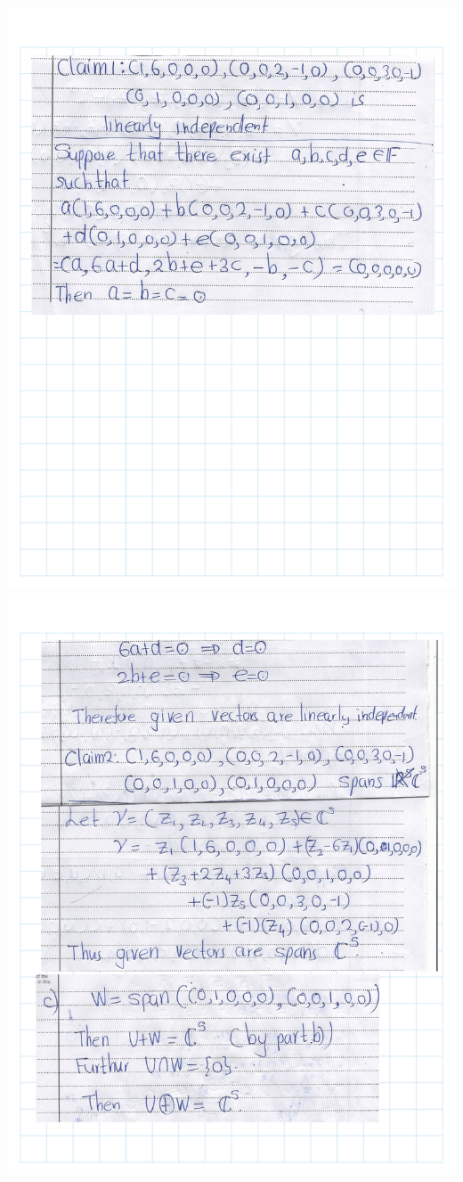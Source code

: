 \documentclass[
]{book}
\theoremstyle{definition}
\theoremstyle{definition}
\theoremstyle{definition}
\theoremstyle{definition}
\theoremstyle{remark}
\begin{document}
\includegraphics{fig/Ex 2B and 2C/EX2B (11).png}
\includegraphics{fig/Ex 2B and 2C/EX2B (12).png}
\end{document}
